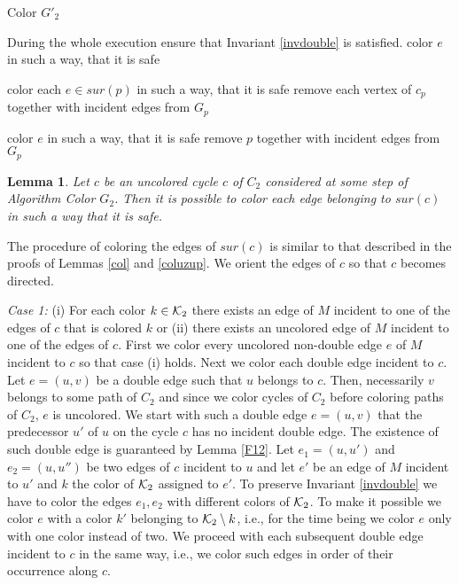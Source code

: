 \documentclass[a4, 11pt]{article}
\newcommand{\dowod}{\noindent{\bf Proof.~}}
\newcommand{\<}{\langle}
\renewcommand{\>}{\rangle}
\newcommand{\Kd}{{\cal K}_2}
\newtheorem{lemma}{Lemma}
\begin{document}
\begin{algorithm}
  \caption{Color $G'_2$}
  \label{alg:col_gprim2}
  \begin{algorithmic}
	  \State During the whole execution ensure that Invariant \ref{invdouble} is satisfied. 
        \State color $e$ in such a way, that it is safe
      \EndFor
    \EndWhile 
    
        \State color each $e \in sur(p)$ in such a way, that it is safe
      \EndFor
      \State remove each vertex of $c_p$ together with incident edges from $G_p$
    \EndWhile
    
        \State color  $e$ in such a way, that it is safe
      \EndFor
      \State remove $p$ together with incident edges from $G_p$
    \EndWhile
		
		
    \end{algorithmic}
\end{algorithm}




\begin{lemma} \label{cykl45}
Let $c$ be an uncolored cycle $c$ of $C_2$ considered at some step of Algorithm Color $G_2$. Then it is possible to color each edge belonging to $sur(c)$ in such a way that it is safe.
\end{lemma}
\dowod The procedure of coloring the edges of $sur(c)$ is similar to that described in the proofs of Lemmas \ref{col} and \ref{coluzup}. 
We orient the edges of $c$ so that $c$ becomes directed. 

{\em Case 1:} (i) For each color $k \in \Kd$ there exists an edge of $M$ incident to one of the edges of $c$ that is colored $k$  or (ii) there exists an uncolored edge of $M$ incident to one of the edges of $c$. 
First we color every uncolored non-double edge $e$ of $M$ incident to $c$ so that case (i) holds. Next we color each double edge incident to $c$.
Let $e=(u,v)$ be a double edge such that $u$ belongs to $c$. Then, necessarily  $v$ belongs to some path of $C_2$ and since we color cycles of $C_2$ before coloring paths of $C_2$, $e$ is uncolored. We start with such a double edge $e=(u,v)$ that the predecessor $u'$ of $u$ on the cycle $c$ has no incident double edge. The existence of such double edge is guaranteed by Lemma \ref{F12}. Let $e_1=(u,u')$ and $e_2=(u, u'')$ be two edges of $c$ incident to $u$ and let $e'$ be an edge of $M$ incident to $u'$ and $k$ the color of $\Kd$ assigned to $e'$.  To preserve Invariant \ref{invdouble} we  have to color the edges $e_1, e_2$ with different colors of $\Kd$. To make it possible we color $e$ with a color $k'$ belonging to $\Kd \setminus k$, i.e., for the time being we color $e$ only with one color instead of two.  
We proceed with each subsequent double edge incident to $c$ in the same way, i.e., we color such edges in order of their occurrence along $c$. 
\end{document}
